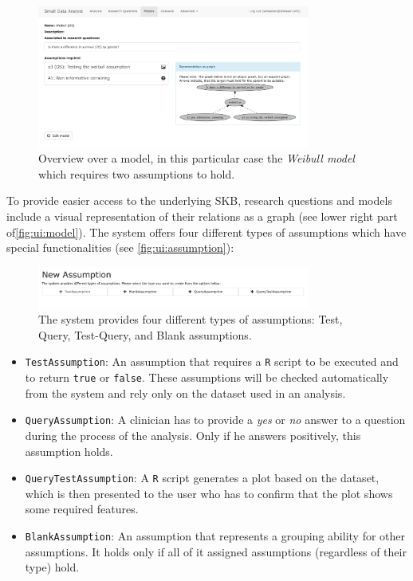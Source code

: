 \begin{figure}[h]
\centering
\includegraphics[width=0.8\textwidth]{figures/ui_Weibull_Model}
\caption{Overview over a model, in this particular case the \textit{Weibull model} which requires two assumptions to hold.}
\label{fig:ui:model}
\end{figure}

To provide easier access to the underlying \gls{SKB}, research questions and models include a visual representation of their relations as a graph (see lower right part of\autoref{fig:ui:model}). The system offers four different types of assumptions which have special functionalities (see \autoref{fig:ui:assumption}):

\begin{figure}[h]
\centering
\includegraphics[width=0.8\textwidth]{figures/ui_new_assumption}
\caption{The system provides four different types of assumptions: Test, Query, Test-Query, and Blank assumptions.}
\label{fig:ui:assumption}
\end{figure}


\begin{itemize}
	\item \texttt{TestAssumption}: An assumption that requires a \texttt{R} script to be executed and to return \texttt{true} or \texttt{false}. These assumptions will be checked automatically from the system and rely only on the dataset used in an analysis.
	\item \texttt{QueryAssumption}: A clinician has to provide a \textit{yes} or \textit{no} answer to a question during the process of the analysis. Only if he answers positively, this assumption holds.
	\item \texttt{QueryTestAssumption}: A \texttt{R} script generates a plot based on the dataset, which is then presented to the user who has to confirm that the plot shows some required features.
	\item \texttt{BlankAssumption}: An assumption that represents a grouping ability for other assumptions. It holds only if all of it assigned assumptions (regardless of their type) hold. 
\end{itemize}

